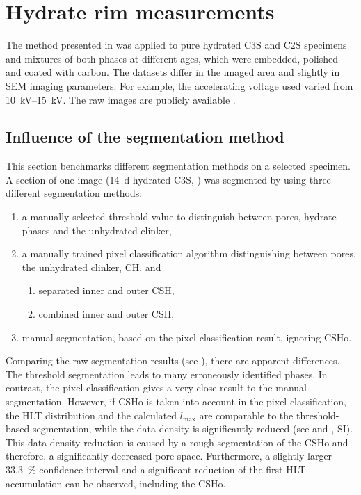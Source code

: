 \chapter{Hydrate rim measurements}
\label{chap:hydrate-rim}

The method presented in  was applied to pure hydrated \ac{C3S} and \ac{C2S} specimens and mixtures of both phases at different ages, which were embedded, polished and coated with carbon.
The datasets differ in the imaged area and slightly in SEM imaging parameters.
For example, the accelerating voltage used varied from \qtyrange{10}{15}{\kilo\volt}.
The raw images are publicly available \cite{kleiner.2023a, kleiner.2025e, kleiner.2025d}.



\FloatBarrier
\section{Influence of the segmentation method}

This section benchmarks different segmentation methods on a selected specimen.
A  section of one image (\qty{14}{\day} hydrated \ac{C3S}, \cite{kleiner.2024a}) was segmented by using three different segmentation methods:

\begin{enumerate}
	\item a manually selected threshold value to distinguish between pores, hydrate phases and the unhydrated clinker,
	\item a manually trained pixel classification algorithm distinguishing between pores, the unhydrated clinker, \ac{CH}, and
	\begin{enumerate}
		\item separated inner and outer \ac{CSH},
		\item combined inner and outer \ac{CSH},
	\end{enumerate}
	\item manual segmentation, based on the pixel classification result, ignoring \ac{CSHo}.
\end{enumerate}

Comparing the raw segmentation results (see ), there are apparent differences.
The threshold segmentation leads to many erroneously identified phases.
In contrast, the pixel classification gives a very close result to the manual segmentation.
However, if \ac{CSHo} is taken into account in the pixel classification, the \ac{HLT} distribution and the calculated $l_\text{max}$ are comparable to the threshold-based segmentation, while the data density is significantly reduced (see  and  \cite{kleiner.2024}, \ac{SI}).
This data density reduction is caused by a rough segmentation of the \ac{CSHo} and therefore, a significantly decreased pore space.
Furthermore, a slightly larger \qty{33.3}{\percent} confidence interval and a significant reduction of the first \ac{HLT} accumulation can be observed, including the \ac{CSHo}.

